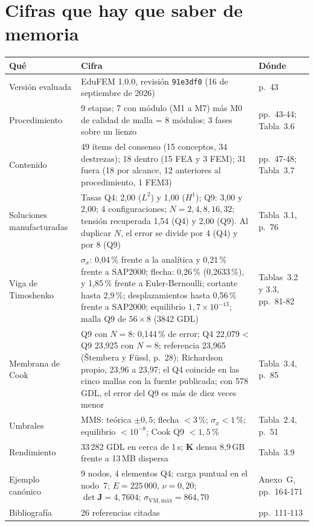 \documentclass[11pt,a4paper]{article}
\begin{document}
\section{Cifras que hay que saber de memoria}\label{sec:cifras}

{\small
\begin{longtable}{@{}L{4.0cm}L{8.2cm}L{3.5cm}@{}}
\toprule
\textbf{Qué} & \textbf{Cifra} & \textbf{Dónde}\\
\midrule\endhead
\bottomrule\endfoot
Versión evaluada & EduFEM 1.0.0, revisión \texttt{91e3df0} (16 de septiembre de 2026) & p.~43\\
Procedimiento & 9 etapas; 7 con módulo (M1 a M7) más M0 de calidad de malla = 8 módulos; 3 fases sobre un lienzo & pp.~43-44; Tabla~3.6\\
Contenido & 49 ítems del consenso (15 conceptos, 34 destrezas); 18 dentro (15 FEA y 3 FEM); 31 fuera (18 por alcance, 12 anteriores al procedimiento, 1 FEM3) & pp.~47-48; Tabla~3.7\\
Soluciones manufacturadas & Tasas Q4: 2,00 ($L^2$) y 1,00 ($H^1$); Q9: 3,00 y 2,00; 4 configuraciones; $N=2,4,8,16,32$; tensión recuperada 1,54 (Q4) y 2,00 (Q9). Al duplicar $N$, el error se divide por 4 (Q4) y por 8 (Q9) & Tabla~3.1, p.~76\\
Viga de Timoshenko & $\sigma_x$: 0,04\,\% frente a la analítica y 0,21\,\% frente a SAP2000; flecha: 0,26\,\% (0,2633\,\%), y 1,85\,\% frente a Euler-Bernoulli; cortante hasta 2,9\,\%; desplazamientos hasta 0,56\,\% frente a SAP2000; equilibrio $1{,}7\times10^{-13}$; malla Q9 de $56\times8$ (3842 GDL) & Tablas~3.2 y 3.3, pp.~81-82\\
Membrana de Cook & Q9 con $N=8$: 0,144\,\% de error; Q4 22,079 < Q9 23,925 con $N=8$; referencia 23,965 (Štembera y Füssl, p.~28); Richardson propio, 23,96 a 23,97; el Q4 coincide en las cinco mallas con la fuente publicada; con 578 GDL, el error del Q9 es más de diez veces menor & Tabla~3.4, p.~85\\
Umbrales & MMS: teórica $\pm0{,}5$; flecha $<3$\,\%; $\sigma_x<1$\,\%; equilibrio $<10^{-8}$; Cook Q9 $<1{,}5$\,\% & Tabla~2.4, p.~51\\
Rendimiento & 33\,282 GDL en cerca de 1\,s; $\mathbf{K}$ densa 8,9\,GB frente a 13\,MB dispersa & Tabla~3.9\\
Ejemplo canónico & 9 nodos, 4 elementos Q4; carga puntual en el nodo~7; $E=225\,000$, $\nu=0{,}20$; $\det\mathbf{J}=4{,}7604$; $\sigma_{\mathrm{VM,máx}}=864{,}70$ & Anexo~G, pp.~164-171\\
Bibliografía & 26 referencias citadas & pp.~111-113\\
\end{longtable}}
\end{document}
